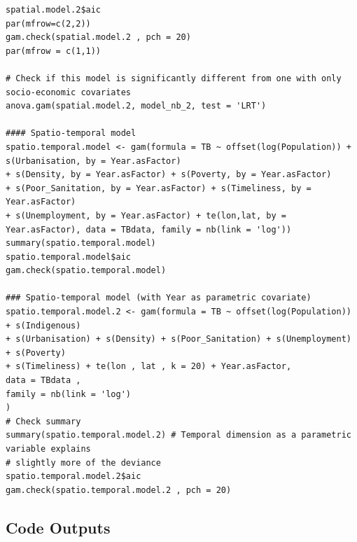 \begin{verbatim}
spatial.model.2$aic
par(mfrow=c(2,2))
gam.check(spatial.model.2 , pch = 20)
par(mfrow = c(1,1))

# Check if this model is significantly different from one with only socio-economic covariates
anova.gam(spatial.model.2, model_nb_2, test = 'LRT')

#### Spatio-temporal model
spatio.temporal.model <- gam(formula = TB ~ offset(log(Population)) + s(Urbanisation, by = Year.asFactor) 
+ s(Density, by = Year.asFactor) + s(Poverty, by = Year.asFactor) 
+ s(Poor_Sanitation, by = Year.asFactor) + s(Timeliness, by = Year.asFactor) 
+ s(Unemployment, by = Year.asFactor) + te(lon,lat, by = Year.asFactor), data = TBdata, family = nb(link = 'log'))
summary(spatio.temporal.model)
spatio.temporal.model$aic
gam.check(spatio.temporal.model)

### Spatio-temporal model (with Year as parametric covariate)
spatio.temporal.model.2 <- gam(formula = TB ~ offset(log(Population)) + s(Indigenous) 
+ s(Urbanisation) + s(Density) + s(Poor_Sanitation) + s(Unemployment) + s(Poverty)
+ s(Timeliness) + te(lon , lat , k = 20) + Year.asFactor,
data = TBdata , 
family = nb(link = 'log')
)
# Check summary
summary(spatio.temporal.model.2) # Temporal dimension as a parametric variable explains 
# slightly more of the deviance
spatio.temporal.model.2$aic
gam.check(spatio.temporal.model.2 , pch = 20)

\end{verbatim}


\subsection{Code Outputs}
\begin{verbatim}

\end{verbatim}